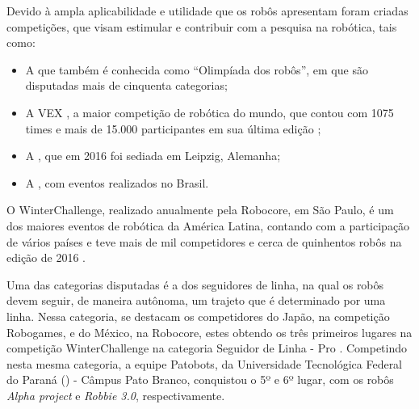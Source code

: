 Devido à ampla aplicabilidade e utilidade que os robôs apresentam foram criadas competições, que visam estimular e 
contribuir com a pesquisa na robótica, tais como:
\begin{itemize}
 \item A  que também é conhecida como ``Olimpíada dos robôs'', em 
que são disputadas mais de cinquenta categorias;
 \item A VEX , a maior competição de robótica do mundo, que contou com 
 1075 times e mais de 15.000 participantes em sua última edição \cite{vex_guiness};
 \item A , que em 2016 foi sediada em Leipzig, Alemanha;
 \item A , com eventos realizados no Brasil.\par
\end{itemize}

O WinterChallenge, realizado anualmente pela Robocore, em São Paulo, 
é um dos maiores eventos de robótica da América Latina, contando com a participação de vários países e teve 
mais de mil competidores e cerca de quinhentos robôs na edição de 2016 \cite{maua}.\par

Uma das categorias disputadas é a dos seguidores de linha, na qual os robôs devem seguir, de maneira autônoma, 
um trajeto que é determinado por uma linha. Nessa categoria, se destacam os competidores do Japão, na competição Robogames, 
e do México, na Robocore, estes obtendo os três primeiros lugares na competição WinterChallenge na categoria 
Seguidor de Linha - Pro \cite{winter}. Competindo nesta mesma categoria, 
a equipe Patobots, da Universidade Tecnológica Federal do Paraná 
() - 
Câmpus Pato Branco, conquistou o 5º e 6º lugar, com os robôs \textit{Alpha project} e 
\textit{Robbie 3.0}, respectivamente.\par

\begin{comment}
Para que os robôs sejam flexíveis, reprogramáveis e sobretudo confiáveis, sendo capazes de atuar nas mais diversas áreas, 
estes precisam ser inteligentes. Para \citeonline{murphy2000}, um robô não é inteligente, entretanto, este pode pode agir 
de maneira inteligente se utilizar inteligência artificial (\sigla{IA}{Inteligência artificial}).
\end{comment}


